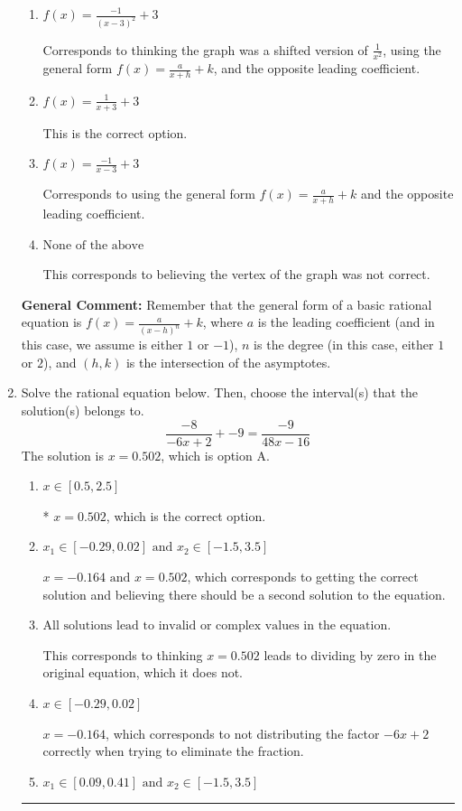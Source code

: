 \documentclass{extbook}[14pt]
\newcommand{\litem}[1]{\item #1

\rule{\textwidth}{0.4pt}}
\begin{document}
\begin{enumerate}
{\begin{enumerate}[label=\Alph*.]
Corresponds to thinking the graph was a shifted version of $\frac{1}{x^2}$.
\item \( f(x) = \frac{-1}{(x - 3)^2} + 3 \)

Corresponds to thinking the graph was a shifted version of $\frac{1}{x^2}$, using the general form $f(x) = \frac{a}{x+h}+k$, and the opposite leading coefficient.
\item \( f(x) = \frac{1}{x + 3} + 3 \)

This is the correct option.
\item \( f(x) = \frac{-1}{x - 3} + 3 \)

Corresponds to using the general form $f(x) = \frac{a}{x+h}+k$ and the opposite leading coefficient.
\item \( \text{None of the above} \)

This corresponds to believing the vertex of the graph was not correct.
\end{enumerate}

\textbf{General Comment:} Remember that the general form of a basic rational equation is $ f(x) = \frac{a}{(x-h)^n} + k$, where $a$ is the leading coefficient (and in this case, we assume is either $1$ or $-1$), $n$ is the degree (in this case, either $1$ or $2$), and $(h, k)$ is the intersection of the asymptotes.
}
\litem{
Solve the rational equation below. Then, choose the interval(s) that the solution(s) belongs to.
\[ \frac{-8}{-6x + 2} + -9 = \frac{-9}{48x -16} \]The solution is \( x = 0.502 \), which is option A.\begin{enumerate}[label=\Alph*.]
\item \( x \in [0.5,2.5] \)

* $x = 0.502$, which is the correct option.
\item \( x_1 \in [-0.29, 0.02] \text{ and } x_2 \in [-1.5,3.5] \)

$x = -0.164 \text{ and } x = 0.502$, which corresponds to getting the correct solution and believing there should be a second solution to the equation.
\item \( \text{All solutions lead to invalid or complex values in the equation.} \)

This corresponds to thinking $x = 0.502$ leads to dividing by zero in the original equation, which it does not.
\item \( x \in [-0.29,0.02] \)

$x = -0.164$, which corresponds to not distributing the factor $-6x + 2$ correctly when trying to eliminate the fraction.
\item \( x_1 \in [0.09, 0.41] \text{ and } x_2 \in [-1.5,3.5] \)


\end{enumerate}}
\end{enumerate}
\end{document}
